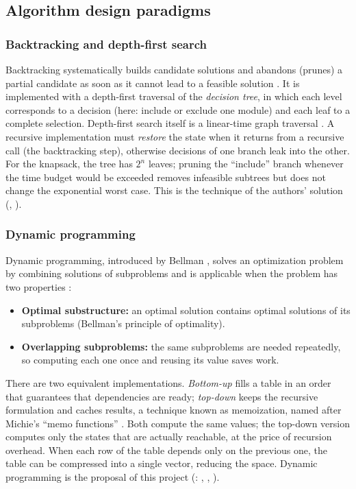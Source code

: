 \subsection{Algorithm design paradigms}

\subsubsection{Backtracking and depth-first search}

Backtracking systematically builds candidate solutions and abandons (prunes) a partial candidate as soon as it cannot lead to a feasible solution \cite{golomb1965}. It is implemented with a depth-first traversal of the \emph{decision tree}, in which each level corresponds to a decision (here: include or exclude one module) and each leaf to a complete selection. Depth-first search itself is a linear-time graph traversal \cite{tarjan1972,cormen2022}. A recursive implementation must \emph{restore} the state when it returns from a recursive call (the backtracking step), otherwise decisions of one branch leak into the other. For the knapsack, the tree has $2^n$ leaves; pruning the ``include'' branch whenever the time budget would be exceeded removes infeasible subtrees but does not change the exponential worst case. This is the technique of the authors' solution (, ).

\subsubsection{Dynamic programming}

Dynamic programming, introduced by Bellman \cite{bellman1957}, solves an optimization problem by combining solutions of subproblems and is applicable when the problem has two properties \cite{cormen2022,kleinberg2006}:

\begin{itemize}[leftmargin=1.4em,itemsep=1pt]
\item \textbf{Optimal substructure:} an optimal solution contains optimal solutions of its subproblems (Bellman's principle of optimality).
\item \textbf{Overlapping subproblems:} the same subproblems are needed repeatedly, so computing each one once and reusing its value saves work.
\end{itemize}

There are two equivalent implementations. \emph{Bottom-up} fills a table in an order that guarantees that dependencies are ready; \emph{top-down} keeps the recursive formulation and caches results, a technique known as memoization, named after Michie's ``memo functions'' \cite{michie1968}. Both compute the same values; the top-down version computes only the states that are actually reachable, at the price of recursion overhead. When each row of the table depends only on the previous one, the table can be compressed into a single vector, reducing the space. Dynamic programming is the proposal of this project (: , , ).

